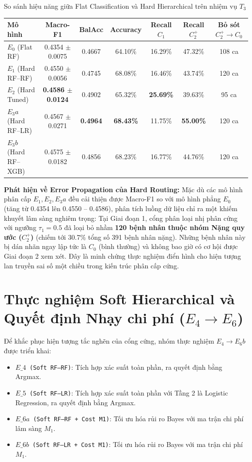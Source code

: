 \begin{table}{So sánh hiệu năng giữa Flat Classification và Hard Hierarchical trên nhiệm vụ $T_3$}
\centering
\label{tab:hard-hierarchical-results}
\begin{tabular}{l c c c c c c}
\toprule
\textbf{Mô hình} & \textbf{Macro-F1} & \textbf{BalAcc} & \textbf{Accuracy} & \textbf{Recall $C_1$} & \textbf{Recall $C_2^+$} & \textbf{Bỏ sót $C_2^+ \to C_0$} \\
\midrule
$E_0$ (Flat RF)       & 0.4354 $\pm$ 0.0075 & 0.4667 & 64.10\% & 16.29\% & 47.32\% & 108 ca \\
$E_1$ (Hard RF--RF)   & 0.4550 $\pm$ 0.0056 & 0.4745 & 68.08\% & 16.46\% & 43.74\% & 120 ca \\
$E_2$ (Hard Tuned)    & \textbf{0.4586 $\pm$ 0.0124} & 0.4902 & 65.32\% & \textbf{25.69\%} & 39.63\% & 95 ca \\
$E_3a$ (Hard RF--LR)  & 0.4567 $\pm$ 0.0271 & \textbf{0.4964} & \textbf{68.43\%} & 11.75\% & \textbf{55.00\%} & 120 ca \\
$E_3b$ (Hard RF--XGB) & 0.4575 $\pm$ 0.0182 & 0.4856 & 68.23\% & 16.77\% & 44.76\% & 120 ca \\
\bottomrule
\end{tabular}
\end{table}

\textbf{Phát hiện về Error Propagation của Hard Routing:}
Mặc dù các mô hình phân cấp $E_1, E_2, E_3a$ đều cải thiện được Macro-F1 so với mô hình phẳng $E_0$ (tăng từ 0.4354 lên 0.4550 -- 0.4586), phân tích luồng dữ liệu chỉ ra một khiếm khuyết lâm sàng nghiêm trọng:
Tại Giai đoạn 1, cổng phân loại nhị phân cứng với ngưỡng $\tau_1 = 0.5$ đã loại bỏ nhầm \textbf{120 bệnh nhân thuộc nhóm Nặng quy ước ($C_2^+$)} (chiếm tới 30.7\% tổng số 391 bệnh nhân nặng). Những bệnh nhân này bị dán nhãn ngay lập tức là $C_0$ (bình thường) và không bao giờ có cơ hội được Giai đoạn 2 xem xét. Đây là minh chứng thực nghiệm điển hình cho hiện tượng lan truyền sai số một chiều trong kiến trúc phân cấp cứng.

\section{Thực nghiệm Soft Hierarchical và Quyết định Nhạy chi phí ($E_4 \to E_6$)}
\label{sec:thuc-nghiem-soft-cost}

Để khắc phục hiện tượng tắc nghẽn của cổng cứng, nhóm thực nghiệm $E_4 \to E_6b$ được triển khai:
\begin{itemize}
    \item \texttt{$E\_4$ (Soft RF--RF)}: Tích hợp xác suất toàn phần, ra quyết định bằng Argmax.
    \item \texttt{$E\_5$ (Soft RF--LR)}: Tích hợp xác suất toàn phần với Tầng 2 là Logistic Regression, ra quyết định bằng Argmax.
    \item \texttt{$E\_6a$ (Soft RF--RF + Cost M1)}: Tối ưu hóa rủi ro Bayes với ma trận chi phí lâm sàng $M_1$.
    \item \texttt{$E\_6b$ (Soft RF--LR + Cost M1)}: Tối ưu hóa rủi ro Bayes với ma trận chi phí $M_1$.
\end{itemize}

